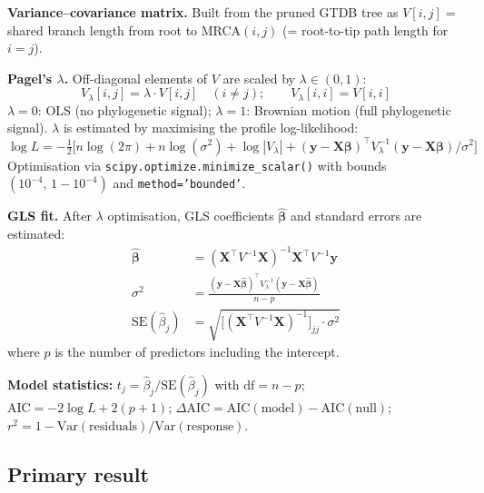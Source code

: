 \documentclass[11pt]{article}
\begin{document}
\textbf{Variance--covariance matrix.}
Built from the pruned GTDB tree as $V[i,j] = $ shared branch length from root
to MRCA$(i,j)$ (= root-to-tip path length for $i = j$).

\textbf{Pagel's $\lambda$.}
Off-diagonal elements of $V$ are scaled by $\lambda \in (0,1)$:
\begin{equation}
V_\lambda[i,j] = \lambda \cdot V[i,j] \quad (i \neq j); \qquad
V_\lambda[i,i] = V[i,i]
\end{equation}
$\lambda = 0$: OLS (no phylogenetic signal); $\lambda = 1$: Brownian motion
(full phylogenetic signal).  $\lambda$ is estimated by maximising the profile
log-likelihood:
\begin{equation}
\log L = -\tfrac{1}{2}\bigl[n\log(2\pi) + n\log(\sigma^2) +
  \log|V_\lambda| +
  (\mathbf{y} - \mathbf{X}\boldsymbol{\beta})^\top
  V_\lambda^{-1}
  (\mathbf{y} - \mathbf{X}\boldsymbol{\beta}) / \sigma^2\bigr]
\end{equation}
Optimisation via \texttt{scipy.optimize.minimize\_scalar()} with bounds
$(10^{-4},\, 1 - 10^{-4})$ and \texttt{method='bounded'}.

\textbf{GLS fit.}
After $\lambda$ optimisation, GLS coefficients $\hat{\boldsymbol{\beta}}$ and
standard errors are estimated:
\begin{align}
\hat{\boldsymbol{\beta}} &=
  (\mathbf{X}^\top V^{-1} \mathbf{X})^{-1} \mathbf{X}^\top V^{-1} \mathbf{y}
\\[4pt]
\sigma^2 &=
  \frac{(\mathbf{y} - \mathbf{X}\hat{\boldsymbol{\beta}})^\top
    V_\lambda^{-1}
    (\mathbf{y} - \mathbf{X}\hat{\boldsymbol{\beta}})}{n - p}
\\[4pt]
\mathrm{SE}(\hat{\beta}_j) &=
  \sqrt{\bigl[(\mathbf{X}^\top V^{-1} \mathbf{X})^{-1}\bigr]_{jj} \cdot \sigma^2}
\end{align}
where $p$ is the number of predictors including the intercept.

\textbf{Model statistics:}
$t_j = \hat{\beta}_j / \mathrm{SE}(\hat{\beta}_j)$ with $\mathrm{df} = n - p$;
$\mathrm{AIC} = -2\log L + 2(p + 1)$;
$\Delta\mathrm{AIC} = \mathrm{AIC}(\text{model}) - \mathrm{AIC}(\text{null})$;
$r^2 = 1 - \mathrm{Var}(\text{residuals}) / \mathrm{Var}(\text{response})$.

\subsection{Primary result}
\end{document}
